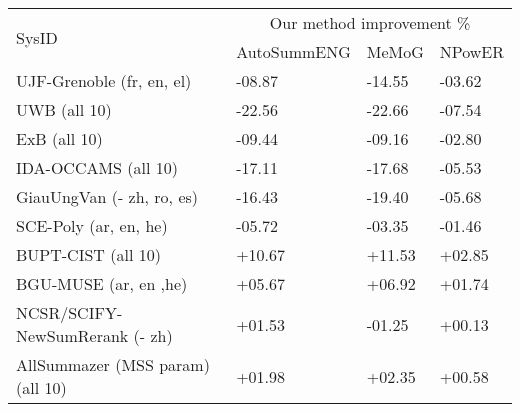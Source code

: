 
\begin{tabular}{p{12cm}p{6cm}p{4cm}p{4cm}} 
\hline \hline
\multirow{2}{*}{SysID} & \multicolumn{3}{c}{Our method improvement \%}\\
\cline{2-4}
					& AutoSummENG 	& MeMoG 	& NPowER \\
\hline
UJF-Grenoble (fr, en, el) 	& -08.87 		& -14.55	& -03.62 \\
UWB (all 10) 		& -22.56 		& -22.66 	& -07.54 \\
ExB (all 10) 		& -09.44 		& -09.16 	& -02.80 \\
IDA-OCCAMS (all 10) 		& -17.11 		& -17.68 	& -05.53 \\
GiauUngVan (- zh, ro, es)	& -16.43		& -19.40	& -05.68 \\
SCE-Poly (ar, en, he)	& -05.72		& -03.35	& -01.46 \\
BUPT-CIST (all 10)		& +10.67		& +11.53	& +02.85 \\
BGU-MUSE (ar, en ,he)	& +05.67		& +06.92	& +01.74 \\
NCSR/SCIFY-NewSumRerank (- zh)		& +01.53		& -01.25	& +00.13 \\
\hline
AllSummazer (MSS param) (all 10)		& +01.98		& +02.35	& +00.58 \\
\hline \hline
\end{tabular}

